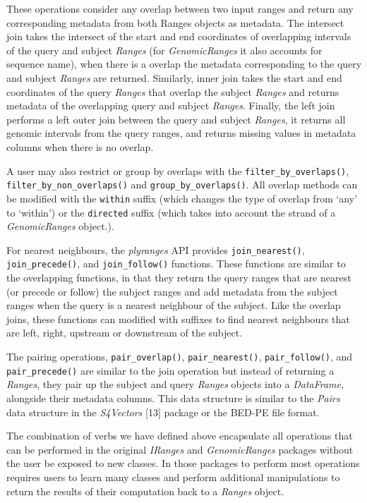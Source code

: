 \documentclass[10pt,letterpaper]{article}
\begin{document}
These operations consider any overlap between two input ranges and
return any corresponding metadata from both Ranges objects as metadata.
The intersect join takes the intersect of the start and end coordinates
of overlapping intervals of the query and subject \emph{Ranges} (for
\emph{GenomicRanges} it also accounts for sequence name), when there is
a overlap the metadata corresponding to the query and subject
\emph{Ranges} are returned. Similarly, inner join takes the start and
end coordinates of the query \emph{Ranges} that overlap the subject
\emph{Ranges} and returns metadata of the overlapping query and subject
\emph{Ranges}. Finally, the left join performs a left outer join between
the query and subject \emph{Ranges}, it returns all genomic intervals
from the query ranges, and returns missing values in metadata columns
when there is no overlap.

A user may also restrict or group by overlaps with the
\texttt{filter\_by\_overlaps()}, \texttt{filter\_by\_non\_overlaps()}
and \texttt{group\_by\_overlaps()}. All overlap methods can be modified
with the \texttt{within} suffix (which changes the type of overlap from
`any' to `within') or the \texttt{directed} suffix (which takes into
account the strand of a \emph{GenomicRanges} object.).

For nearest neighbours, the \emph{plyranges} API provides
\texttt{join\_nearest()}, \texttt{join\_precede()}, and
\texttt{join\_follow()} functions. These functions are similar to the
overlapping functions, in that they return the query ranges that are
nearest (or precede or follow) the subject ranges and add metadata from
the subject ranges when the query is a nearest neighbour of the subject.
Like the overlap joins, these functions can modified with suffixes to
find nearest neighbours that are left, right, upstream or downstream of
the subject.

The pairing operations, \texttt{pair\_overlap()},
\texttt{pair\_nearest()}, \texttt{pair\_follow()}, and
\texttt{pair\_precede()} are similar to the join operation but instead
of returning a \emph{Ranges}, they pair up the subject and query
\emph{Ranges} objects into a \emph{DataFrame}, alongside their metadata
columns. This data structure is similar to the \emph{Pairs} data
structure in the \emph{S4Vectors} {[}13{]} package or the BED-PE file
format.

The combination of verbs we have defined above encapsulate all
operations that can be performed in the original \emph{IRanges} and
\emph{GenomicRanges} packages without the user be exposed to new
classes. In those packages to perform most operations requires users to
learn many classes and perform additional manipulations to return the
results of their computation back to a \emph{Ranges} object.
\end{document}
